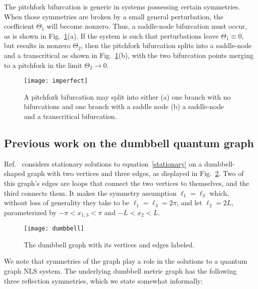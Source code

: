 \documentclass{article}
\numberwithin{equation}{section}
\numberwithin{figure}{section}
\begin{document}
\begin{rem}
\label{rem:imperfect}
The pitchfork bifurcation is generic in systems possessing certain symmetries. When those symmetries are broken by a small general perturbation, the coefficient $\Theta_1$ will become nonzero. Thus, a saddle-node bifurcation must occur, as is shown in Fig.~\ref{fig:imperfect}(a). If the system is such that perturbations leave $\Theta_1 \equiv 0$, but results in nonzero $\Theta_2$, then the pitchfork bifurcation splits into a saddle-node and a transcritical as shown in Fig.~\ref{fig:imperfect}(b), with the two bifurcation points merging to a pitchfork in the limit $\Theta_2\to 0$. 
\end{rem}

\begin{figure}[htbp] %
   \centering
   \texttt{[image: imperfect]} 
   \caption{A pitchfork bifurcation may split into either (a) one branch with no bifurcations and one branch with a saddle node (b) a saddle-node and a transcritical bifurcation. }
 \label{fig:imperfect}
\end{figure}


\subsection{Previous work on the dumbbell quantum graph}

Ref.~\cite{Marzuola:2016bl} considers stationary solutions to equation~\eqref{stationary}
on a dumbbell-shaped graph with two vertices and three edges, as displayed in Fig.~\ref{fig:dumbbell}. Two of this graph's edges are loops that connect the two vertices to themselves, and the third connects them. It makes the symmetry assumption $\ell_1 = \ell_3$ which, without loss of generality they take to be $\ell_1=\ell_3=2\pi$, and let $\ell_2 = 2 L$, parameterized by  $-\pi< x_{1,3}<\pi$ and $-L<x_2 <L$.

\begin{figure}[htbp] %
   \centering
   \texttt{[image: dumbbell]} 
   \caption{The dumbbell graph with its vertices and edges labeled.}
\label{fig:dumbbell}
\end{figure}

We note that symmetries of the graph play a role in the solutions to a quantum graph NLS system. The underlying dumbbell metric graph has the following three reflection symmetries, which we state somewhat informally:
\end{document}
